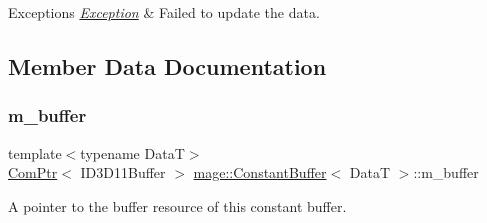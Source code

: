 \begin{DoxyExceptions}{Exceptions}
{\em \hyperlink{classmage_1_1_exception}{Exception}} & Failed to update the data. \\
\hline
\end{DoxyExceptions}


\subsection{Member Data Documentation}
\hypertarget{classmage_1_1_constant_buffer_a394571e3102fe053f3357e2e218c0eda}{}\label{classmage_1_1_constant_buffer_a394571e3102fe053f3357e2e218c0eda} 
\subsubsection{\texorpdfstring{m\+\_\+buffer}{m\_buffer}}
{\footnotesize\ttfamily template$<$typename DataT$>$ \\
\hyperlink{namespacemage_ae74f374780900893caa5555d1031fd79}{Com\+Ptr}$<$ I\+D3\+D11\+Buffer $>$ \hyperlink{classmage_1_1_constant_buffer}{mage\+::\+Constant\+Buffer}$<$ DataT $>$\+::m\+\_\+buffer\hspace{0.3cm}{\ttfamily [private]}}

A pointer to the buffer resource of this constant buffer. 